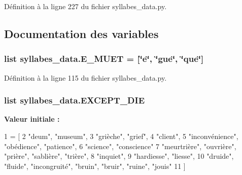 Définition à la ligne 227 du fichier syllabes\+\_\+data.\+py.



\subsection{Documentation des variables}
\hypertarget{namespacesyllabes__data_af248eabf3e770c0e6a43f1415ef59516}{}
\subsubsection[{E\+\_\+\+M\+U\+E\+T}]{\setlength{\rightskip}{0pt plus 5cm}list syllabes\+\_\+data.\+E\+\_\+\+M\+U\+E\+T = \mbox{[}\char`\"{}e\char`\"{}, \char`\"{}gue\char`\"{}, \char`\"{}que\char`\"{}\mbox{]}}\label{namespacesyllabes__data_af248eabf3e770c0e6a43f1415ef59516}


Définition à la ligne 115 du fichier syllabes\+\_\+data.\+py.

\hypertarget{namespacesyllabes__data_aa4c06550f00a4d1b5c37db42d65dcfdc}{}
\subsubsection[{E\+X\+C\+E\+P\+T\+\_\+\+D\+I\+E}]{\setlength{\rightskip}{0pt plus 5cm}list syllabes\+\_\+data.\+E\+X\+C\+E\+P\+T\+\_\+\+D\+I\+E}\label{namespacesyllabes__data_aa4c06550f00a4d1b5c37db42d65dcfdc}
{\bfseries Valeur initiale \+:}
\begin{DoxyCode}
1 = [
2 \textcolor{stringliteral}{"deum"}, \textcolor{stringliteral}{"museum"},
3 \textcolor{stringliteral}{"grièche"}, \textcolor{stringliteral}{"grief"},
4 \textcolor{stringliteral}{"client"},
5 \textcolor{stringliteral}{"inconvénience"}, \textcolor{stringliteral}{"obédience"}, \textcolor{stringliteral}{"patience"},
6 \textcolor{stringliteral}{"science"}, \textcolor{stringliteral}{"conscience"}
7 \textcolor{stringliteral}{"meurtrière"}, \textcolor{stringliteral}{"ouvrière"}, \textcolor{stringliteral}{"prière"}, \textcolor{stringliteral}{"sablière"}, \textcolor{stringliteral}{"trière"},
8 \textcolor{stringliteral}{"inquiet"},
9 \textcolor{stringliteral}{"hardiesse"}, \textcolor{stringliteral}{"liesse"},
10 \textcolor{stringliteral}{"druide"}, \textcolor{stringliteral}{"fluide"}, \textcolor{stringliteral}{"incongruité"}, \textcolor{stringliteral}{"bruin"}, \textcolor{stringliteral}{"bruir"}, \textcolor{stringliteral}{"ruine"}, \textcolor{stringliteral}{"jouis"}
11 ]
\end{DoxyCode}


